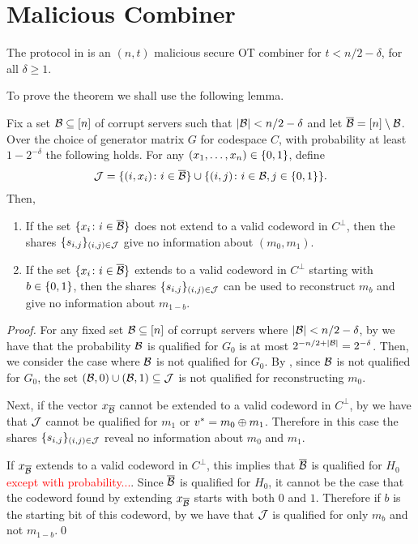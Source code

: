 \section{Malicious Combiner}



\begin{theorem}\label{thm:main}
	The protocol in  is an $(n,t)$ malicious secure OT combiner for $t < n/2 - \delta$, for all $\delta \geq 1$.
\end{theorem}

To prove the theorem we shall use the following lemma.
\begin{lemma}\label{lem:secret-info}
	Fix a set ${\mathcal B} \subseteq [n]$ of corrupt servers such that $|{\mathcal B}| < n/2 - \delta$ and let $\overline{{\mathcal B}} = [n]\setminus {\mathcal B}$.
	Over the choice of generator matrix $G$ for codespace $C$, with probability at least $1-2^{-\delta}$ the following holds.
	For any $(x_1,\dotsc, x_n) \in {\{0,1\}}$, define
	\begin{align*}
		{\mathcal J} = \{ (i,x_i)\colon i \in \overline{{\mathcal B}} \} \cup \{ (i,j) \colon i \in{\mathcal B}, j \in {\{0,1\}} \}.
	\end{align*}
	Then,
	\begin{enumerate}
		\item If the set $\{x_i \colon i \in \overline{{\mathcal B}} \}$ does not extend to a valid codeword in $C^\perp$, then the shares $\{ s_{i,j} \}_{(i,j) \in {\mathcal J}}$ give no information about $(m_0,m_1)$.
		\item If the set $\{x_i\colon i \in \overline{{\mathcal B}}\}$ extends to a valid codeword in $C^\perp$ starting with $b \in {\{0,1\}}$, then the shares $\{s_{i,j}\}_{(i,j)\in {\mathcal J}}$ can be used to reconstruct $m_b$ and give no information about $m_{1-b}$.
	\end{enumerate}
\end{lemma}
\begin{proof}
	For any fixed set ${\mathcal B}\subseteq [n]$ of corrupt servers where $|{\mathcal B}| < n/2 - \delta$, by  we have that the probability ${\mathcal B}$ is qualified for $G_0$ is at most $2^{-n/2 + |{\mathcal B}|} = 2^{-\delta}$.
	Then, we consider the case where ${\mathcal B}$ is not qualified for $G_0$.
	By , since ${\mathcal B}$ is not qualified for $G_0$, the set $({\mathcal B}, 0) \cup ({\mathcal B},1) \subseteq {\mathcal J}$ is not qualified for reconstructing $m_0$.
	
	Next, if the vector $x_{\overline{{\mathcal B}}}$ cannot be extended to a valid codeword in $C^\perp$, by  we have that ${\mathcal J}$ cannot be qualified for $m_1$ or $v^* = m_0 \oplus m_1$.
	Therefore in this case the shares $\{ s_{i,j} \}_{(i,j) \in {\mathcal J}}$ reveal no information about $m_0$ and $m_1$.
	
	If $x_{\overline{{\mathcal B}}}$ extends to a valid codeword in $C^\perp$, this implies that $\overline{{\mathcal B}}$ is qualified for $H_0$ \textcolor{red}{except with probability...}.
	Since $\overline{{\mathcal B}}$ is qualified for $H_0$, it cannot be the case that the codeword found by extending $x_{\overline{{\mathcal B}}}$ starts with both $0$ and $1$.
	Therefore if $b$ is the starting bit of this codeword, by  we have that ${\mathcal J}$ is qualified for only $m_b$ and not $m_{1-b}$.\qed
\end{proof}

